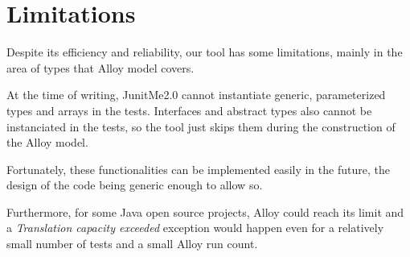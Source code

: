 \section{Limitations}
	Despite its efficiency and reliability, our tool has some limitations, mainly in the area of types that Alloy model covers.
	
	At the time of writing, JunitMe2.0 cannot instantiate generic, parameterized types and arrays in the tests.
	Interfaces and abstract types also cannot be instanciated in the tests, so the tool just skips them during the construction of the Alloy model.
	
	Fortunately, these functionalities can be implemented easily in the future, the design of the code being generic enough to allow so.
	
	Furthermore, for some Java open source projects, Alloy could reach its limit and a \textit{Translation capacity exceeded} exception would happen even for a relatively small number of tests and a small Alloy run count.